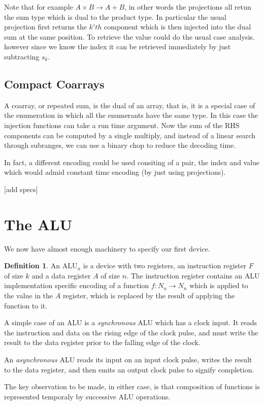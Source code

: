 \documentclass[oneside]{book}
\theoremstyle{plain}
\theoremstyle{definition}
\newtheorem{definition}{Definition}
\theoremstyle{plain}
\begin{document}
Note that for example $A \times B \rightarrow A + B$, in other words the
projections all retun the sum type which is dual to the product type.
In particular the usual projection first returns the $k'th$ component 
which is then injected into the dual sum at the same position.
To retrieve the value could do the usual case analysis. however
since we know the index it can be retrieved immediately by
just subtracting $s_k$.


\subsection{Compact Coarrays}
A coarray, or repeated sum, is the dual of an array, that is,
it is a special case of the enumeration in which all the
enumerants have the same type. In this case the injection
functions can take a run time argument.  Now the sum of the
RHS components can be computed by a single multiply, and
instead of a linear search through subranges, we can 
use a binary chop to reduce the decoding time.

In fact, a different encoding could be used consiting of
a pair, the index and value which would admid constant
time encoding (by just using projections).

[add specs]

\section{The ALU}
We now have almost enough machinery to specify our first device.
\begin{definition}
An $\mathrm {ALU}_n$ is a device with two registers, an instruction register $F$
of size $k$
and a data register $A$ of size $n$. The instruction register contains an ALU implementation
specific encoding of a function $f:N_n\rightarrow N_n$ which is applied to the 
value in the $A$ register, which is replaced by the result of applying the function to it.
\end{definition}

A simple case of an ALU is a {\em synchronous} ALU which has a clock input.
It reads the instruction and data on the rising edge of the clock pulse,
and must write the result to the data register prior to the falling edge
of the clock.

An {\em asynchronous} ALU reads its input on an input clock pulse, writes
the result to the data register, and then emits an output clock pulse to
signify completion.

The key observation to be made, in either case, is that composition of functions is represented
temporaly by successive ALU operations.
\end{document}
